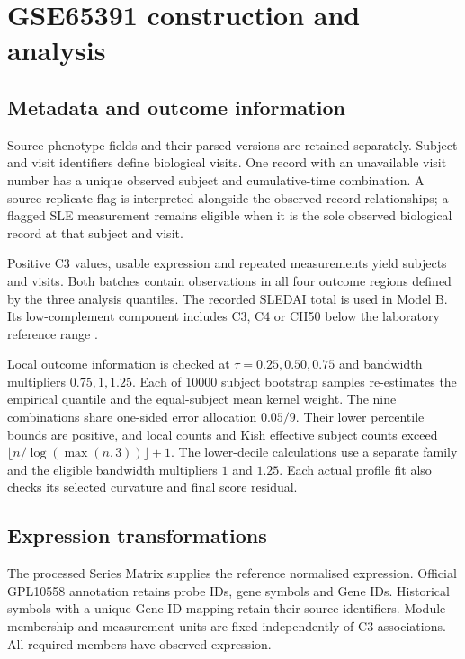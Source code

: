 \section{GSE65391 construction and analysis}\label{supp:gse}



\subsection{Metadata and outcome information}

Source phenotype fields and their parsed versions are retained
separately. Subject and visit identifiers define biological visits.
One record with an unavailable visit number has a unique observed
subject and cumulative-time combination. A source replicate flag
is interpreted alongside the observed record relationships; a
flagged SLE measurement remains eligible when it is the sole
observed biological record at that subject and visit.

Positive C3 values, usable expression and repeated measurements
yield \SLEEligibleSubjects{} subjects and \SLEEligibleVisits{}
visits. Both batches contain observations in all four outcome
regions defined by the three analysis quantiles. The recorded
SLEDAI total is used in Model B. Its low-complement component
includes C3, C4 or CH50 below the laboratory reference range
\cite{torontoSLEDAI2K}.

Local outcome information is checked at $\tau=0.25,0.50,0.75$ and
bandwidth multipliers $0.75,1,1.25$. Each of 10000 subject bootstrap
samples re-estimates the empirical quantile and the equal-subject
mean kernel weight. The nine combinations share one-sided error
allocation $0.05/9$. Their lower percentile bounds are positive,
and local counts and Kish effective subject counts exceed
$\lfloor n/\log(\max(n,3))\rfloor+1$. The lower-decile calculations
use a separate family and the eligible bandwidth multipliers
$1$ and $1.25$. Each actual profile fit also checks its selected
curvature and final score residual.

\subsection{Expression transformations}

The processed Series Matrix supplies the reference normalised
expression. Official GPL10558 annotation retains probe IDs, gene
symbols and Gene IDs. Historical symbols with a unique Gene ID
mapping retain their source identifiers. Module membership and
measurement units are fixed independently of C3 associations.
All required members have observed expression.

